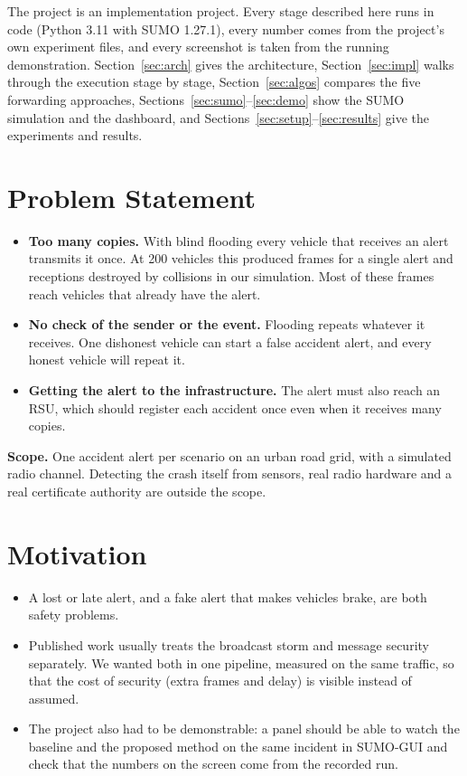 \documentclass[11pt, a4paper]{article}
\begin{document}
The project is an implementation project. Every stage described here runs in code (Python 3.11 with SUMO 1.27.1), every
number comes from the project's own experiment files, and every screenshot is taken from the running demonstration.
Section~\ref{sec:arch} gives the architecture, Section~\ref{sec:impl} walks through the execution stage by stage,
Section~\ref{sec:algos} compares the five forwarding approaches, Sections~\ref{sec:sumo}--\ref{sec:demo} show the SUMO
simulation and the dashboard, and Sections~\ref{sec:setup}--\ref{sec:results} give the experiments and results.

\section{Problem Statement}
\begin{itemize}[noitemsep, topsep=2pt]
  \item \textbf{Too many copies.} With blind flooding every vehicle that receives an alert transmits it once. At 200
        vehicles this produced \NFrFlood{} frames for a single alert and \NLossFlood{} receptions destroyed by collisions in
        our simulation. Most of these frames reach vehicles that already have the alert.
  \item \textbf{No check of the sender or the event.} Flooding repeats whatever it receives. One dishonest vehicle can
        start a false accident alert, and every honest vehicle will repeat it.
  \item \textbf{Getting the alert to the infrastructure.} The alert must also reach an RSU, which should register each
        accident once even when it receives many copies.
\end{itemize}
\noindent\textbf{Scope.} One accident alert per scenario on an urban road grid, with a simulated radio channel. Detecting
the crash itself from sensors, real radio hardware and a real certificate authority are outside the scope.

\section{Motivation}
\begin{itemize}[noitemsep, topsep=2pt]
  \item A lost or late alert, and a fake alert that makes vehicles brake, are both safety problems.
  \item Published work usually treats the broadcast storm \cite{ni1999broadcast,wisitpongphan2007} and message security
        \cite{raya2008datacentric,zhang2008batch} separately. We wanted both in one pipeline, measured on the same traffic,
        so that the cost of security (extra frames and delay) is visible instead of assumed.
  \item The project also had to be demonstrable: a panel should be able to watch the baseline and the proposed method on
        the same incident in SUMO-GUI and check that the numbers on the screen come from the recorded run.
\end{itemize}
\end{document}
